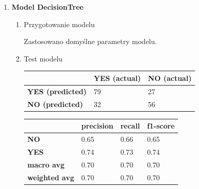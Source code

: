 \documentclass{article}
\begin{document}
\begin{enumerate}
\begin{enumerate}
        
    \end{enumerate}

    \item \textbf{Model DecisionTree}
    \begin{enumerate}
        \item Przygotowanie modelu

        Zastosowano domyślne parametry modelu.
        
        \item Test modelu

        \begin{table}[H]
            \centering
            \begin{tabular}{|l|l|l|}
            \hline
             & \textbf{YES (actual)} & \textbf{NO (actual)}  \\ \hline
            \textbf{YES (predicted)} & 79 & 27 \\ \hline
            \textbf{NO (predicted)} & 32 & 56  \\ \hline
            \end{tabular}
        \end{table}

        
        \begin{table}[H]
            \centering
            \begin{tabular}{|l|l|l|l|}
            \hline
            & \textbf{precision} & \textbf{recall} & \textbf{f1-score}  \\ \hline
            \textbf{NO} & 0.65 & 0.66 & 0.65 \\ \hline
            \textbf{YES} & 0.74 & 0.73 & 0.74 \\ \hline
            \textbf{macro avg} & 0.70 & 0.70 & 0.70 \\ \hline
            \textbf{weighted avg} & 0.70 & 0.70 & 0.70 \\ \hline
            \end{tabular}
        \end{table}


\end{enumerate}
\end{enumerate}
\end{document}

